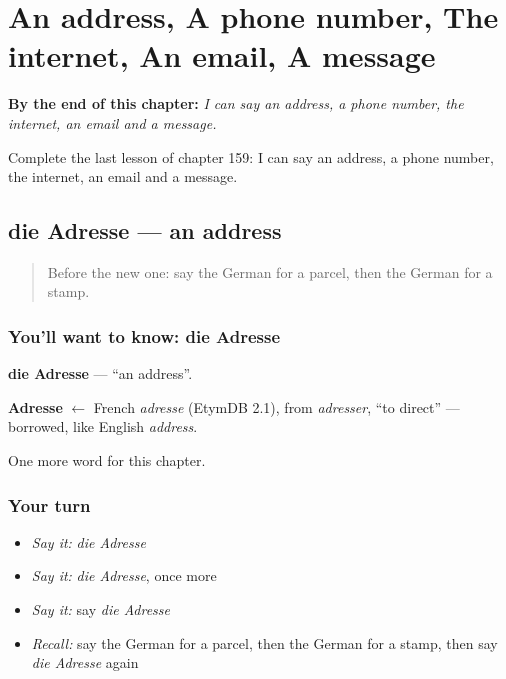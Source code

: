
\chapter{An address, A phone number, The internet, An email, A message}
\label{ch:ge-an-address-a-phone-number-the-internet-an-email-a-message}

\begin{chapteropening}
\textbf{By the end of this chapter:} \emph{I can say an address, a phone number, the internet, an email and a message.}

Complete the last lesson of chapter 159: I can say an address, a phone number, the internet, an email and a message.
\end{chapteropening}

\section[die Adresse]{die Adresse — an address}

\label{lesson:GE-C159-adresse}



\begin{quote}
Before the new one: say the German for a parcel, then the German for a stamp.
\end{quote}

\subsection*{You'll want to know: die Adresse}
\textbf{die Adresse} — \textquotedblleft{}an address\textquotedblright{}.

\begin{cousinweb}
\textbf{Adresse} $\leftarrow$ French \emph{adresse} (EtymDB 2.1), from \emph{adresser}, \textquotedblleft{}to direct\textquotedblright{} — borrowed, like English \emph{address}.
\end{cousinweb}

\begin{grammarlens}[title={What you've built}]
One more word for this chapter.
\end{grammarlens}

\subsection*{Your turn}
\begin{itemize}
\raggedright
  \item \emph{Say it:} \emph{die Adresse}
  \item \emph{Say it:} \emph{die Adresse}, once more
  \item \emph{Say it:} say \emph{die Adresse}
  \item \emph{Recall:} say the German for a parcel, then the German for a stamp, then say \emph{die Adresse} again
\end{itemize}

